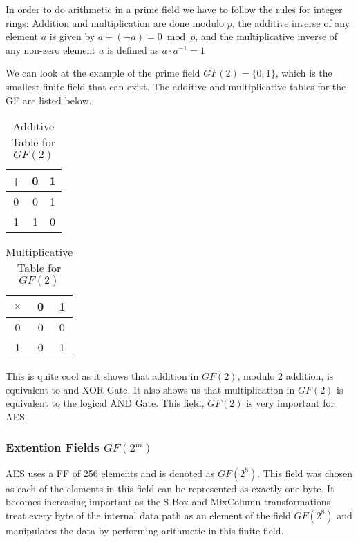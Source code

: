 In order to do arithmetic in a prime field we have to follow the rules for integer rings:  Addition and multiplication are done modulo $p$, the additive inverse of any element $a$ is given by $a + (-a) = 0 \bmod p$, and the multiplicative inverse of any non-zero element $a$ is defined as $a \cdot a^{-1} = 1$ 

We can look at the example of the prime field $GF(2) = \{0,1\}$, which is the smallest finite field that can exist. The additive and multiplicative tables for the GF are listed below.


\begin{table}[H]
\begin{center}
\begin{tabular}{ |c|cc| } 
 \hline
 + & 0 & 1 \\ 
 \hline
 0 & 0 & 1 \\ 
 1 & 1 & 0 \\ 
 \hline
\end{tabular}
\caption{Additive Table for $GF(2)$}
\label{GF-2-Addition}
\end{center}
\end{table}

\begin{table}[H]
\begin{center}
\begin{tabular}{ |c|cc| } 
 \hline
 $\times$ & 0 & 1 \\ 
 \hline
 0 & 0 & 0 \\ 
 1 & 0 & 1 \\ 
 \hline
\end{tabular}
\caption{Multiplicative Table for $GF(2)$}
\label{GF-2-Multiplicative}
\end{center}
\end{table}

This is quite cool as it shows that addition in $GF(2)$, modulo 2 addition, is equivalent to and XOR Gate. It also shows us that multiplication in $GF(2)$ is equivalent to the logical AND Gate. This field, $GF(2)$ is very important for AES.

\subsubsection{Extention Fields $GF(2^m)$}  

AES uses a FF of 256 elements and is denoted as $GF(2^8)$. This field was chosen as each of the elements in this field can be represented as exactly one byte. It becomes increasing important as the S-Box and MixColumn transformations treat every byte of the internal data path as an element of the field $GF(2^8)$ and manipulates the data by performing arithmetic in this finite field.

